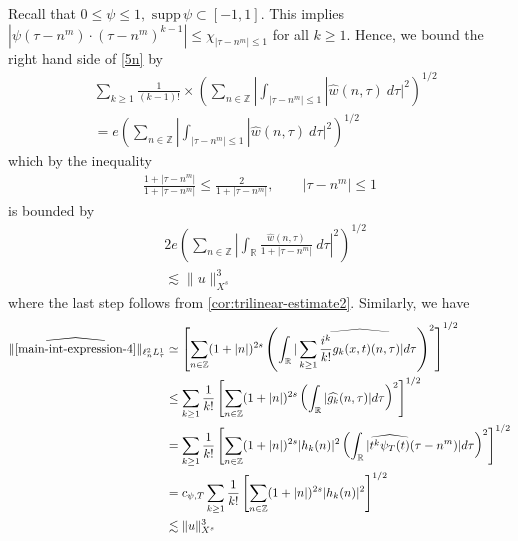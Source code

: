 \documentclass[12pt,reqno]{amsart}
\numberwithin{equation}{section}  %
\numberwithin{figure}{section}
\newcommand{\rr}{\mathbb{R}}
\newcommand{\zz}{\mathbb{Z}}
\newcommand{\wh}{\widehat}
\theoremstyle{plain}
\theoremstyle{definition}
\theoremstyle{remark}
\begin{document}
%
Recall that $0 \le \psi \le 1, \text{ supp} \, \psi \subset [-1,1 ]$. 
This implies $| \psi\left( \tau - n^{m } \right) \cdot \left( \tau - n^{m } \right)^{k 
-1} | \le \chi_{| \tau - n^{m } | \le 1}$ for all $k \ge 1$. Hence, we bound the
right hand side of \eqref{5n} by
%
\begin{equation*}
	\begin{split}
		& \sum_{k \ge 1} \frac{1}{(k-1)!} \times \left( \sum_{n \in \zz} | 
		\int_{| \tau - n^{m}  |\le 1} | \wh{w}(n, \tau) \ d \tau |^2 
		\right)^{1/2}
    \\
    & = e \left( \sum_{n \in \zz} | 
		\int_{| \tau - n^{m}  |\le 1} | \wh{w}(n, \tau) \ d \tau |^2 
		\right)^{1/2}
	\end{split}
\end{equation*}
%
which by the inequality
%
\begin{equation*}
	\begin{split}
		\frac{1 + | \tau - n^{m } |}{1 + | \tau  - n^{m } |} \le 
		\frac{2}{1 + | \tau - n^{m } |}, \qquad | \tau - n^{m }  | \le 1
	\end{split}
\end{equation*}
%
is bounded by 
%
\begin{equation}
\label{main-int4-est-X-s-part}
	\begin{split}
		& 2e \left( \sum_{n \in \zz} | \int_\rr
		\frac{\wh{w}(n, \tau)}{1 + | \tau - n^{m } |} \ d \tau |^2 
		\right)^{1/2} \\
		& \lesssim \|u\|_{X^s}^3
	\end{split}
\end{equation}
%
where the last step follows from \autoref{cor:trilinear-estimate2}. Similarly,
we have
%
%
\begin{equation}
\label{main-int4-est-Y-s-part}
	\begin{split}
    \|\wh{\eqref{main-int-expression-4}}\|_{ \ell^2_n L^1_\tau }
		& \simeq \left[ \sum_{n \in
		\zz}(1 + | n |)^{2s} \left( \int_{\rr} | \sum_{k \ge 1}
		\wh{\frac{i^{k}}{k!}g_{k}(x,t)(n, \tau)} |d \tau \right)^{2} \right]^{1/2}
		\\
		& \le \sum_{k \ge 1} \frac{1}{k!} \left[ \sum_{n \in \zz} (1 + | n
    |)^{2s} \left( \int_{\rr} | \wh{g_{k}}(n, \tau) | d \tau \right)^{2}
		\right]^{1/2}
		\\
		& = \sum_{k \ge 1} \frac{1}{k!} \left[ \sum_{n \in \zz} (1 + | n
		|)^{2s} | h_{k}(n) |^2 \left( \int_{\rr} | \wh{t^{k} \psi_{T}(t)}(\tau -
		n^{m}) |d \tau \right)^{2} \right]^{1/2}
		\\
		& = c_{\psi, T} \sum_{k \ge 1} \frac{1}{k!} \left[ \sum_{n \in \zz} (1 + | n
		|)^{2s} | h_{k}(n) |^2 \right]^{1/2}
		\\
		& \lesssim \|u\|_{X^s}^{3}
	\end{split}
\end{equation}
\end{document}
